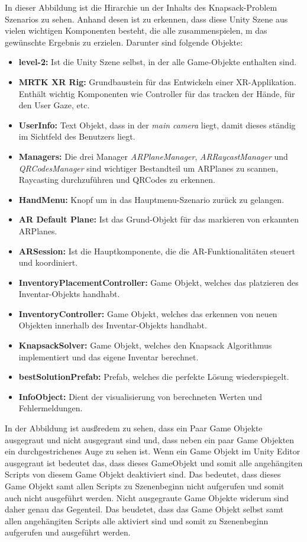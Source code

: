 In dieser Abbildung ist die Hirarchie un der Inhalts des Knapsack-Problem Szenarios zu sehen. Anhand desen ist zu erkennen,
dass diese Unity Szene aus vielen wichtigen Komponenten besteht, die alle zusammenspielen, m das gewünschte Ergebnis
zu erzielen. Darunter sind folgende Objekte:
\begin{itemize}
    \item \textbf{level-2:} Ist die Unity Szene selbst, in der alle Game-Objekte enthalten sind.
    \item \textbf{MRTK XR Rig:} Grundbaustein für das Entwickeln einer XR-Applikation. Enthält wichtig Komponenten
    wie Controller für das tracken der Hände, für den User Gaze, etc.
    \item \textbf{UserInfo:} Text Objekt, dass in der \textit{main camera } liegt, damit dieses ständig im Sichtfeld des
    Benutzers liegt.
    \item \textbf{Managers:} Die drei Manager \textit{ARPlaneManager}, \textit{ARRaycastManager} und \textit{QRCodesManager}
    sind wichtiger Bestandteil um ARPlanes zu scannen, Raycasting durchzuführen und QRCodes zu erkennen.
    \item \textbf{HandMenu:} Knopf um in das Hauptmenu-Szenario zurück zu gelangen.
    \item \textbf{AR Default Plane:} Ist das Grund-Objekt für das markieren von erkannten ARPlanes.
    \item \textbf{ARSession:} Ist die Hauptkomponente, die die AR-Funktionalitäten steuert und koordiniert.
    \item \textbf{InventoryPlacementController:} Game Objekt, welches das platzieren des Inventar-Objekts handhabt.
    \item \textbf{InventoryController:} Game Objekt, welches das erkennen von neuen Objekten innerhalb des Inventar-Objekts handhabt.
    \item \textbf{KnapsackSolver:} Game Objekt, welches den Knapsack Algorithmus implementiert und das eigene Inventar berechnet.
    \item \textbf{bestSolutionPrefab:} Prefab, welches die perfekte Lösung wiederspiegelt.
    \item \textbf{InfoObject:} Dient der visualisierung von berechneten Werten und Fehlermeldungen.
\end{itemize}

In der Abbildung ist ausßredem zu sehen, dass ein Paar Game Objekte ausgegraut und nicht ausgegraut sind und, dass neben ein paar Game Objekten ein durchgestrichenes Auge zu sehen ist.
Wenn ein Game Objekt im Unity Editor ausgegraut ist bedeutet das, dass dieses GameObjekt und somit alle angehängiten Scripts von diesem Game Objekt deaktiviert sind.
Das bedeutet, dass dieses Game Objekt samt allen Scripts zu Szenenbeginn nicht aufgerufen und somit auch nicht ausgeführt werden. Nicht ausgegraute Game Objekte widerum sind
daher genau das Gegenteil. Das beudetet, dass das Game Objekt selbst samt allen angehängiten Scripts alle aktiviert sind und somit zu Szenenbeginn aufgerufen und ausgeführt werden.

